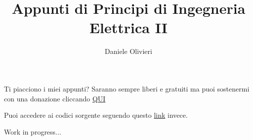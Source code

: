 \documentclass[a4paper,11pt]{scrartcl}
\title{Appunti di Principi di Ingegneria Elettrica II}
\author{Daniele Olivieri}
\date{}
\begin{document}
\maketitle
Ti piacciono i miei appunti? Saranno sempre liberi e gratuiti ma puoi sostenermi con una donazione cliccando \href{https://www.paypal.com/donate?hosted_button_id=7KELP768NJSYW}{QUI}

Puoi accedere ai codici sorgente seguendo questo \href{https://github.com/FlashNoob98/appunti_principi_II_unina}{link} invece.
\setcounter{tocdepth}{2}
\tableofcontents
\setlength\arrayrulewidth{1.2pt} %







Work in progress...
\end{document}

